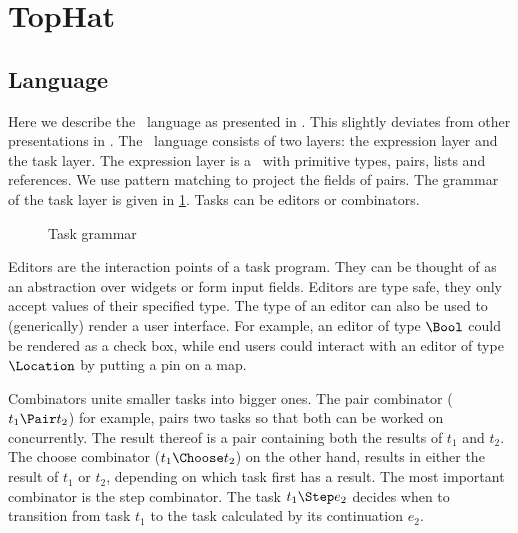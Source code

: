
\section{TopHat}

\subsection{Language}

Here we describe the \TOPHAT\ language as presented in \cite{Steenvoorden22}.
This slightly deviates from other presentations in \cite{conf/ppdp/SteenvoordenNK19,conf/ifl/NausSK19,conf/sfp/NausS20}.
The \TOPHAT\ language consists of two layers: the expression layer and the task layer.
The expression layer is a \STLC\ with primitive types, pairs, lists and references.
We use pattern matching to project the fields of pairs.
The grammar of the task layer is given in \cref{fig:task-grammar}.
Tasks can be editors or combinators.

\begin{figure}[h]
  \caption{Task grammar}
  \label{fig:task-grammar}
\end{figure}

Editors are the interaction points of a task program.
They can be thought of as an abstraction over widgets or form input fields.
Editors are type safe,
they only accept values of their specified type.
The type of an editor can also be used to (generically) render a user interface.
For example,
an editor of type $\Bool$ could be rendered as a check box,
while end users could interact with an editor of type $\Location$ by putting a pin on a map.

Combinators unite smaller tasks into bigger ones.
The pair combinator ($t_1 \Pair t_2$) for example,
pairs two tasks so that both can be worked on concurrently.
The result thereof is a pair containing both the results of $t_1$ and $t_2$.
The choose combinator ($t_1 \Choose t_2$) on the other hand,
results in either the result of $t_1$ or $t_2$,
depending on which task first has a result.
The most important combinator is the step combinator.
The task $t_1 \Step e_2$ decides when to transition from task $t_1$
to the task calculated by its continuation $e_2$.

